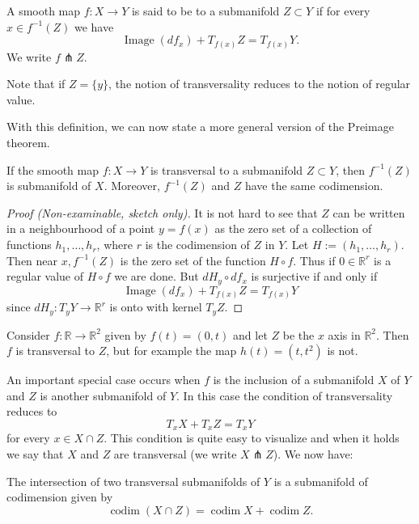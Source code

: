 \begin{definition}[Transversal]
    A smooth map $f: X \rightarrow Y$ is said to be  to a submanifold $Z \subset Y$ if for every $x \in f^{-1}(Z)$ we have
$$
\operatorname{Image}\left(d f_{x}\right)+T_{f(x)} Z=T_{f(x)} Y.
$$
We write $f \pitchfork Z$.
\end{definition}

Note that if $Z=\{y\}$, the notion of transversality reduces to the notion of regular value.

With this definition, we can now state a more general version of the Preimage theorem.

\begin{theorem}
    If the smooth map $f: X \rightarrow Y$ is transversal to a submanifold $Z \subset Y$, then $f^{-1}(Z)$ is submanifold of $X$. Moreover, $f^{-1}(Z)$ and $Z$ have the same codimension.
\end{theorem}
\begin{proof}[Proof (Non-examinable, sketch only)]
    It is not hard to see that $Z$ can be written in a neighbourhood of a point $y=f(x)$ as the zero set of a collection of functions $h_{1}, \ldots, h_{r}$, where $r$ is the codimension of $Z$ in $Y$. Let $H:=\left(h_{1}, \ldots, h_{r}\right)$. Then near $x, f^{-1}(Z)$ is the zero set of the function $H \circ f$. Thus if $0 \in \mathbb{R}^{r}$ is a regular value of $H \circ f$ we are done. But $d H_{y} \circ d f_{x}$ is surjective if and only if
    $$
    \operatorname{Image}\left(d f_{x}\right)+T_{f(x)} Z=T_{f(x)} Y
    $$
    since $d H_{y}: T_{y} Y \rightarrow \mathbb{R}^{r}$ is onto with kernel $T_{y} Z$.
\end{proof}

\begin{example}
    Consider $f: \mathbb{R} \rightarrow \mathbb{R}^{2}$ given by $f(t)=(0, t)$ and let $Z$ be the $x$ axis in $\mathbb{R}^{2}$. Then $f$ is transversal to $Z$, but for example the map $h(t)=\left(t, t^{2}\right)$ is not.
\end{example}

An important special case occurs when $f$ is the inclusion of a submanifold $X$ of $Y$ and $Z$ is another submanifold of $Y$. In this case the condition of transversality reduces to
$$
T_{x} X+T_{x} Z=T_{x} Y
$$
for every $x \in X \cap Z$. This condition is quite easy to visualize and when it holds we say that $X$ and $Z$ are transversal (we write $X \pitchfork Z$). We now have:

\begin{theorem}
    The intersection of two transversal submanifolds of $Y$ is a submanifold of codimension given by
$$
\operatorname{codim}(X \cap Z)=\operatorname{codim} X+\operatorname{codim} Z.
$$
\end{theorem}

